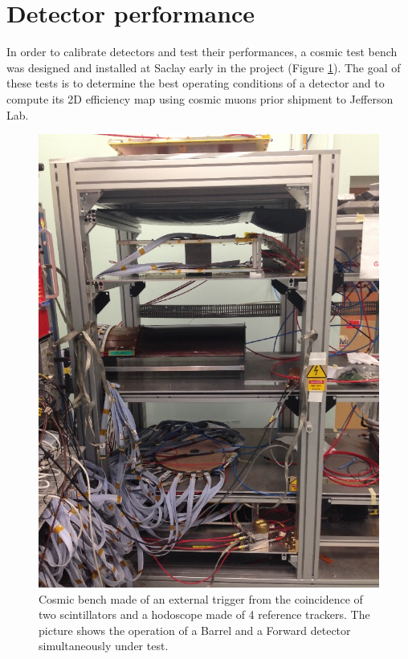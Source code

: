 \section{Detector performance}

In order to calibrate detectors and test their performances, a cosmic test bench was designed and installed at Saclay 
early in the project (Figure \ref{fig:mm-testbench}). The goal of these tests is to determine the best operating 
conditions of a detector and to compute its 2D efficiency map using cosmic muons prior shipment to Jefferson Lab.


\begin{figure}[htb]
 \includegraphics[width=1.0\columnwidth,keepaspectratio]{images/banc_cosmique}
 \caption{Cosmic bench made of an external trigger from the coincidence of two scintillators and a hodoscope made of 4 
reference trackers. The picture shows the operation of a Barrel and a Forward detector simultaneously under test.}
 \label{fig:mm-testbench}
\end{figure}

